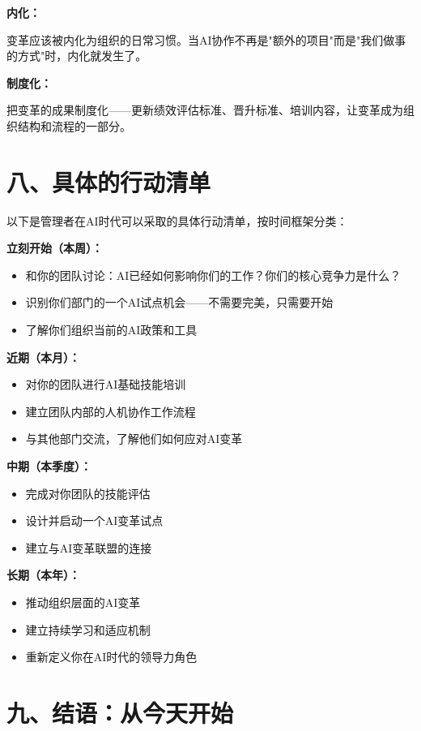 \textbf{内化：}

变革应该被内化为组织的日常习惯。当AI协作不再是"额外的项目"而是"我们做事的方式"时，内化就发生了。

\textbf{制度化：}

把变革的成果制度化——更新绩效评估标准、晋升标准、培训内容，让变革成为组织结构和流程的一部分。

\section{八、具体的行动清单}


以下是管理者在AI时代可以采取的具体行动清单，按时间框架分类：

\textbf{立刻开始（本周）：}

\begin{itemize}
\item 和你的团队讨论：AI已经如何影响你们的工作？你们的核心竞争力是什么？
\item 识别你们部门的一个AI试点机会——不需要完美，只需要开始
\item 了解你们组织当前的AI政策和工具

\end{itemize}
\textbf{近期（本月）：}

\begin{itemize}
\item 对你的团队进行AI基础技能培训
\item 建立团队内部的人机协作工作流程
\item 与其他部门交流，了解他们如何应对AI变革

\end{itemize}
\textbf{中期（本季度）：}

\begin{itemize}
\item 完成对你团队的技能评估
\item 设计并启动一个AI变革试点
\item 建立与AI变革联盟的连接

\end{itemize}
\textbf{长期（本年）：}

\begin{itemize}
\item 推动组织层面的AI变革
\item 建立持续学习和适应机制
\item 重新定义你在AI时代的领导力角色

\end{itemize}
\section{九、结语：从今天开始}


